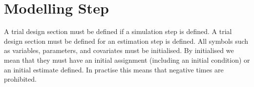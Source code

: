 


\section{Modelling Step}

\begin{valrules}
 {A trial design section must be defined if a simulation
  step is defined.}
 {A trial design section must be defined for an estimation
step is defined.}
 All symbols such as variables,
parameters, and covariates must be initialised. By initialised we mean
that they must have an initial assignment (including an initial
condition) or an initial estimate defined.
 In practise this means that negative
times are prohibited.
\end{valrules}




